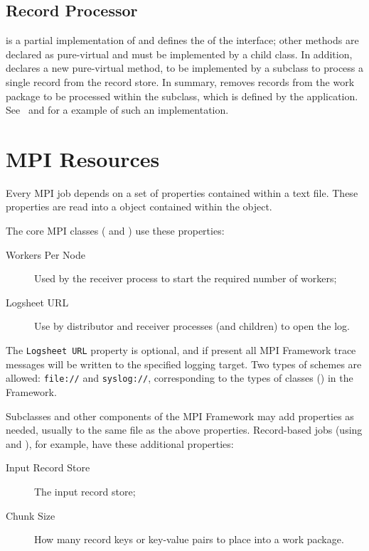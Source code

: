 \subsection{Record Processor}
\label{sec-recordprocessor}
 is a partial implementation of 
 and defines the 
of the  interface; other methods are declared as
pure-virtual and must be implemented by a child class. In addition,
 declares a new pure-virtual method,
 to be implemented by a subclass to process a single
record from the record store. In summary,  removes
records from the work package to be processed within the subclass,
which is defined by the application.
See~ and  for a example of
such an implementation.

\section{MPI Resources}
\label{sec-mpiresources}
Every MPI job depends on a set of properties contained within a text file.
These properties are read into a  object contained within
the  object.

The core MPI classes ( and ) use these
properties:
\begin{description}
\item[Workers Per Node] Used by the receiver process to start the
required number of workers;
\item[Logsheet URL] Use by distributor and receiver processes
(and children) to open the log.
\end{description}

The \verb=Logsheet URL= property is optional, and if present all MPI Framework
trace messages will be written to the specified logging target. Two types of
\URL schemes are allowed: \verb=file://= and \verb=syslog://=, corresponding
to the types of  classes () in the
Framework.

Subclasses and other components of the MPI Framework may add properties as
needed, usually to the same file as the above properties. Record-based jobs
(using  and ), for example,
have these additional properties:

\begin{description}
\item[Input Record Store] The input record store;
\item[Chunk Size] How many record keys or key-value pairs to place into a
work package.
\end{description}

